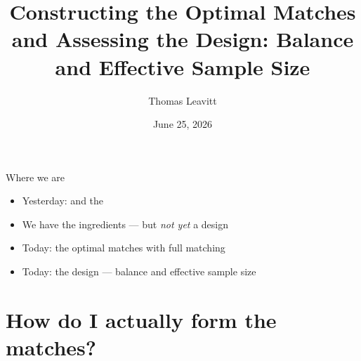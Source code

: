 \documentclass[table, xcolor = {dvipsnames}, 9pt]{beamer}
\title[Constructing \& assessing a matched design]{Constructing the Optimal Matches and Assessing the Design: Balance and Effective Sample Size}
\author{Thomas Leavitt}
\institute[]
{
\medskip
\textit{}
}
\date{June 25, 2026}
\theoremstyle{plain}
\newcommand{\mh}[1]{{\color{magenta}{#1}}}
\begin{document}
\begin{frame}
\titlepage
\end{frame}

\begin{frame}[t]{Where we are}
\vfill
\begin{itemize} \vfill
\item Yesterday: \mh{comparability} and the \mh{effective sample size}  \vfill
\item We have the ingredients --- but \emph{not yet} a design \vfill
\item Today: \mh{construct} the optimal matches with full matching \vfill
\item Today: \mh{assess} the design --- balance and effective sample size \vfill
\end{itemize} \vfill
\end{frame}
\section{How do I actually form the matches?}
\end{document}
